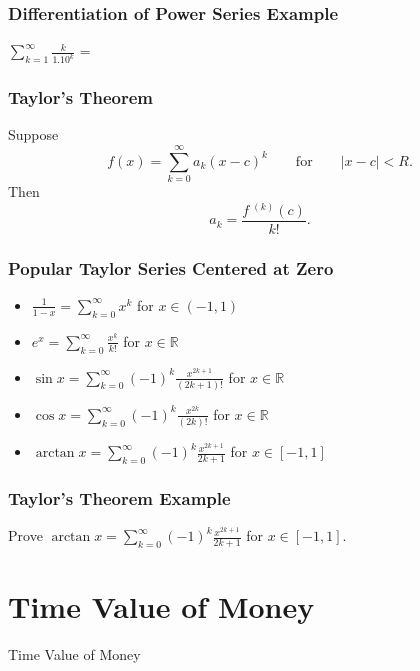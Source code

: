 \documentclass{beamer}
\begin{document}
\begin{frame}[t]
\frametitle{Differentiation of Power Series Example}
\begin{Example}
$\displaystyle\sum_{k = 1}^\infty \frac{k}{1.10^k}$ = 
\end{Example}
\end{frame}

\begin{frame}
\frametitle{Taylor's Theorem}
\begin{Theorem}
Suppose
$$
f(x) = \sum_{k = 0}^\infty a_k (x - c)^k\qquad\text{for}\qquad |x - c| < R.
$$
Then
$$
a_k = \frac{f\ ^{(k)}(c)}{k!}.
$$
\end{Theorem}
\end{frame}

\begin{frame}
\frametitle{Popular Taylor Series Centered at Zero}
{\small
\begin{itemize}
\item $\displaystyle \frac{1}{1 - x} = \sum_{k = 0}^\infty x^k$ for $x\in (-1, 1)$
\item $\displaystyle e^x = \sum_{k = 0}^\infty \frac{x^k}{k!}$ for $x\in\mathbb{R}$
\item $\displaystyle\sin x = \sum_{k = 0}^\infty (-1)^k \frac{x^{2k +1}}{(2k + 1)!}$ for $x\in\mathbb{R}$
\item $\displaystyle\cos x = \sum_{k = 0}^\infty (-1)^k \frac{x^{2k}}{(2k)!}$ for $x\in\mathbb{R}$
\item $\displaystyle\arctan x = \sum_{k = 0}^\infty (-1)^k \frac{x^{2k + 1}}{2k+ 1}$ for $x\in [-1, 1]$
\end{itemize}
}

\end{frame}

\begin{frame}[t]
\frametitle{Taylor's Theorem Example}
\begin{Example}
Prove $\displaystyle\arctan x = \sum_{k = 0}^\infty (-1)^k \frac{x^{2k + 1}}{2k+ 1}$ for $x\in [-1, 1]$.
\end{Example}
\end{frame}

\section{Time Value of Money}

\begin{frame}
\begin{center}
\Huge Time Value of Money
\end{center}
\end{frame}
\end{document}
